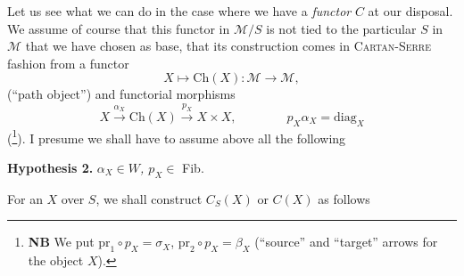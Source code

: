 Let us see what we can do in the case where we have a \textit{functor} $C$ at our disposal. We assume of course that this functor in $\mathcal{M}/S$  is not tied to the particular $S$ in $\mathcal{M}$ that we have chosen as base, that its construction comes in \textsc{Cartan-Serre} fashion from a functor
\[
X \longmapsto \mathrm{Ch}(X) : \mathcal{M} \longrightarrow \mathcal{M},
\]
(``path object'') and functorial morphisms
\[
X \xrightarrow{\alpha_X} \mathrm{Ch}(X) \xrightarrow{p_X} X \times X, \qquad\qquad \boxed{p_X\alpha_X = \mathrm{diag}_X}
\]
(\footnote[58]{\textbf{NB} We put $\mathrm{pr}_1 \circ p_X = \sigma_X$, $\mathrm{pr}_2 \circ p_X = \beta_X$ (``source'' and ``target'' arrows for the object $X$).}). I presume we shall have to assume above all the following

\textbf{Hypothesis 2.} \textit{$\alpha_X \in W$, $p_X \in$} Fib.

For an $X$ over $S$, we shall construct $C_S(X)$ or $C(X)$ as follows
